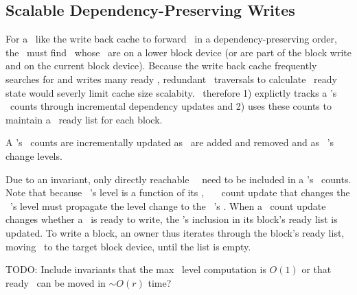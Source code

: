 \subsection{Scalable Dependency-Preserving Writes}
For a \module\ like the write back cache to forward \chdescs\ in a
dependency-preserving order, the \module\ must find \chdescs\ whose
\befores\ are on a lower block device (or are part of the block write
and on the current block device). Because the write back cache
frequently searches for and writes many ready \chdescs, redundant
\before\ traversals to calculate \chdesc\ ready state would severly
limit cache size scalabity.
%
\Kudos\ therefore
%
1) explictly tracks a \chdesc's \before\ counts through incremental
dependency updates
%
and 2) uses these counts to maintain a \chdesc\ ready list for each
block.

A \chdesc's \before\ counts are incrementally updated
%
as \befores\ are added and removed
%
and as \beforing\ \chdesc's change levels.
%

Due to an invariant, only directly reachable \beforing\ \chdescs\ need to be
included in a \chdesc's \before\ counts. 
%
Note that because \anoop\ \chdesc's level is a function of its \befores,
%
\anoop\ \chdesc\ \before\ count update that changes the \noop\ \chdesc's level
must propagate the level change to the \noop\ \chdesc's \afters.
%
When a \before\ count update changes whether a \chdesc\ is ready to
write, the \chdesc's inclusion in its block's ready list is updated.
%
To write a block, an owner thus iterates through the block's ready
list, moving \chdescs\ to the target block device, until the list is
empty.

TODO: Include invariants that the max \before\ level computation is
$O(1)$ or that ready \chdescs\ can be moved in $\sim\! O(r)$ time?
